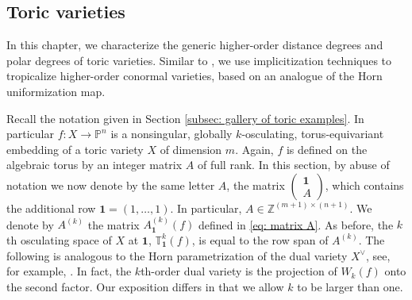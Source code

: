 \documentclass[11pt,reqno]{amsart}
\numberwithin{equation}{section}
\theoremstyle{plain}
\numberwithin{theorem}{section}
\theoremstyle{definition}
\renewcommand{\P}{\mathbb{P}}
\newcommand{\Z}{\mathbb{Z}}
\newcommand{\T}{\mathbb{T}}
\def\bone{{\boldsymbol{1}}}
\begin{document}
\subsection{Toric varieties}

In this chapter, we characterize the generic higher-order distance degrees and polar degrees of toric varieties.
Similar to \cite{Tropical_Discriminants}, we use implicitization techniques to
tropicalize higher-order conormal varieties, based on an analogue of the Horn uniformization map.

Recall the notation given in Section \ref{subsec: gallery of toric examples}. In particular $f\colon X\to\P^n$ is a nonsingular, globally $k$-osculating, torus-equivariant embedding of a toric variety $X$ of dimension $m$. 
Again, $f$ is defined on the algebraic torus by an integer matrix $A$ of full rank.
In this section, by abuse of notation we now denote by the same letter $A$, the matrix
$\begin{pmatrix}
    \bone \\
    A
\end{pmatrix}$,
which contains the additional row $\bone=(1,\dots,1)$.
In particular, $A \in \Z^{(m+1)\times(n+1)}$.
We denote by $A^{(k)}$ the matrix $A_{\bone}^{(k)}(f)$ defined in \eqref{eq: matrix A}.
As before, the $k$th osculating space of $X$ at $\bone$, $\T_{\bone}^k(f)$, is equal to the row span of $A^{(k)}$.
The following is analogous to the Horn parametrization of the dual variety $X^\vee$, see, for example, \cite[Proposition 4.1]{Tropical_Discriminants}.
In fact, the $k$th-order dual variety is the projection of $W_k(f)$ onto the second factor. Our exposition differs in that we allow $k$ to be larger than one.
\end{document}
